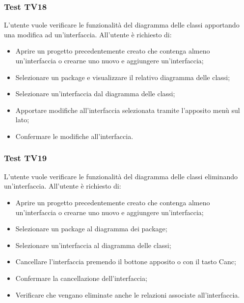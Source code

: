 \documentclass[../PianoDiQualifica.tex]{subfiles}
\begin{document}
	\subsubsection{Test TV18} 
	L'utente vuole verificare le funzionalità del diagramma delle classi apportando una modifica ad un'interfaccia. 
	All'utente è richiesto di: 
	\begin{itemize} 
		\item Aprire un progetto precedentemente creato che contenga almeno un'interfaccia o crearne uno nuovo e aggiungere un'interfaccia;
		\item Selezionare un package e visualizzare il relativo diagramma delle classi; 
		\item Selezionare un'interfaccia dal diagramma delle classi; 
		\item Apportare modifiche all'interfaccia selezionata tramite l'apposito menù sul lato; 
		\item Confermare le modifiche all'interfaccia. 
	\end{itemize} 
	
	
	\subsubsection{Test TV19} 
	L'utente vuole verificare le funzionalità del diagramma delle classi eliminando un'interfaccia. 
	All'utente è richiesto di: 
	\begin{itemize} 
		\item Aprire un progetto precedentemente creato che contenga almeno un'interfaccia o crearne uno nuovo e aggiungere un'interfaccia;
		\item Selezionare un package al diagramma dei package; 
		\item Selezionare un'interfaccia al diagramma delle classi; 
		\item Cancellare l'interfaccia premendo il bottone apposito o con il tasto Canc; 
		\item Confermare la cancellazione dell'interfaccia;
		\item Verificare che vengano eliminate anche le relazioni associate all'interfaccia. 
	\end{itemize} 
	
	
\end{document}
